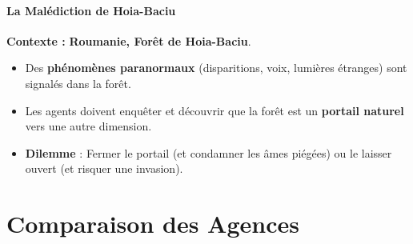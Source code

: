 \documentclass[10pt,a5paper,twoside]{book}
\begin{document}
\newpage

\subsubsection{La Malédiction de Hoia-Baciu}
\textbf{Contexte :} \textbf{Roumanie, Forêt de Hoia-Baciu}.
\begin{itemize}
	\item Des \textbf{phénomènes paranormaux} (disparitions, voix, lumières étranges) sont signalés dans la forêt.
	\item Les agents doivent enquêter et découvrir que la forêt est un \textbf{portail naturel} vers une autre dimension.
	\item \textbf{Dilemme} : Fermer le portail (et condamner les âmes piégées) ou le laisser ouvert (et risquer une invasion).
\end{itemize}

\newpage

\chapter{Comparaison des Agences}

\newpage
\end{document}
